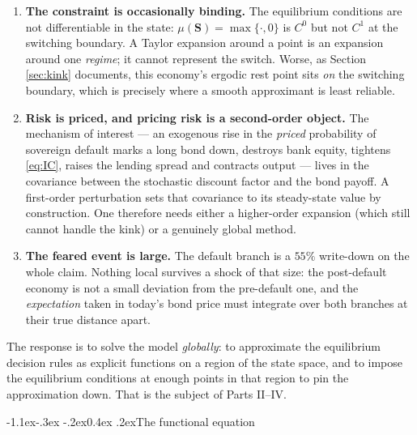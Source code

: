 \documentclass[10pt,a4paper]{article}
\makeatletter
\theoremstyle{definition}
\theoremstyle{plain}
\theoremstyle{remark}
\newcommand{\st}{\mathbf{S}}
\renewcommand\subsection{\@startsection{subsection}{2}{\z@}%
  {-1.1ex\@plus -.3ex \@minus -.2ex}{0.4ex \@plus .2ex}{\normalfont\normalsize\bfseries}}
\makeatother
\begin{document}
\begin{enumerate}
\item \textbf{The constraint is occasionally binding.} The equilibrium conditions are not
differentiable in the state: $\mu(\st) = \max\{\cdot,0\}$ is $C^0$ but not $C^1$ at the
switching boundary. A Taylor expansion around a point is an expansion around one
\emph{regime}; it cannot represent the switch. Worse, as Section \ref{sec:kink} documents,
this economy's ergodic rest point sits \emph{on} the switching boundary, which is precisely
where a smooth approximant is least reliable.

\item \textbf{Risk is priced, and pricing risk is a second-order object.} The mechanism of
interest --- an exogenous rise in the \emph{priced} probability of sovereign default
marks a long bond down, destroys bank equity, tightens \eqref{eq:IC}, raises the lending
spread and contracts output --- lives in the covariance between the stochastic discount
factor and the bond payoff. A first-order perturbation sets that covariance to its
steady-state value by construction. One therefore needs either a higher-order expansion
(which still cannot handle the kink) or a genuinely global method.

\item \textbf{The feared event is large.} The default branch is a $55\%$ write-down on the
whole claim. Nothing local survives a shock of that size: the post-default economy is not a
small deviation from the pre-default one, and the \emph{expectation} taken in today's bond
price must integrate over both branches at their true distance apart.
\end{enumerate}

The response is to solve the model \emph{globally}: to approximate the equilibrium decision
rules as explicit functions on a region of the state space, and to impose the equilibrium
conditions at enough points in that region to pin the approximation down. That is the
subject of Parts II--IV.

\subsection{The functional equation}
\end{document}
